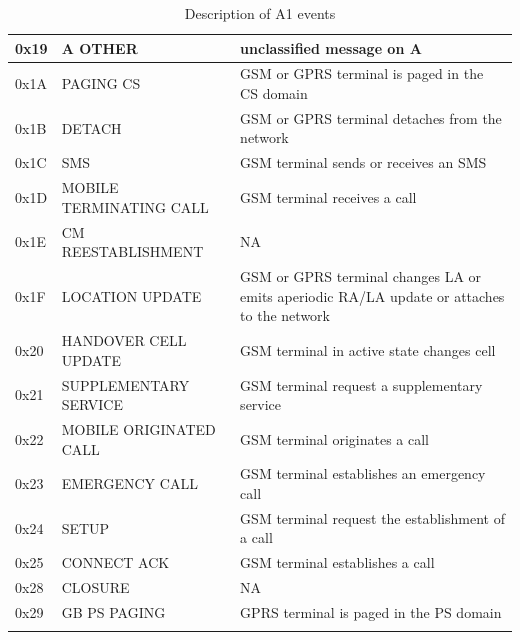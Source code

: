 \documentclass[master,english]{hgbthesis}
\begin{document}
{\begin{longtable}{|l|p{4cm}|p{8cm}|}
		0x19         & A OTHER                              & unclassified message on A                                                                                  \\ \hline
		0x1A         & PAGING CS                            & GSM or GPRS terminal is paged in the CS domain                                                             \\ \hline
		0x1B         & DETACH                               & GSM or GPRS terminal detaches from the network                                                             \\ \hline
		0x1C         & SMS                                  & GSM terminal sends or receives an SMS                                                                      \\ \hline
		0x1D         & MOBILE TERMINATING CALL              & GSM terminal receives a call                                                                               \\ \hline
		0x1E         & CM REESTABLISHMENT                   & NA                                                                                                         \\ \hline
		0x1F         & LOCATION UPDATE                      & GSM or GPRS terminal changes LA or emits aperiodic RA/LA update or attaches to the network                 \\ \hline
		0x20         & HANDOVER CELL UPDATE                 & GSM terminal in active state changes cell                                                                  \\ \hline
		0x21         & SUPPLEMENTARY SERVICE                & GSM terminal request a supplementary service                                                               \\ \hline
		0x22         & MOBILE ORIGINATED CALL               & GSM terminal originates a call                                                                             \\ \hline
		0x23         & EMERGENCY CALL                       & GSM terminal establishes an emergency call                                                                 \\ \hline
		0x24         & SETUP                                & GSM terminal request the establishment of a call                                                           \\ \hline
		0x25         & CONNECT ACK                          & GSM terminal establishes a call                                                                            \\ \hline
		0x28         & CLOSURE                              & NA                                                                                                         \\ \hline
		0x29         & GB PS PAGING                         & GPRS terminal is paged in the PS domain                                                                    \\ \hline
		\caption{Description of A1 events}
		\label{tab:eventtype}
	\end{longtable}}
\end{document}
